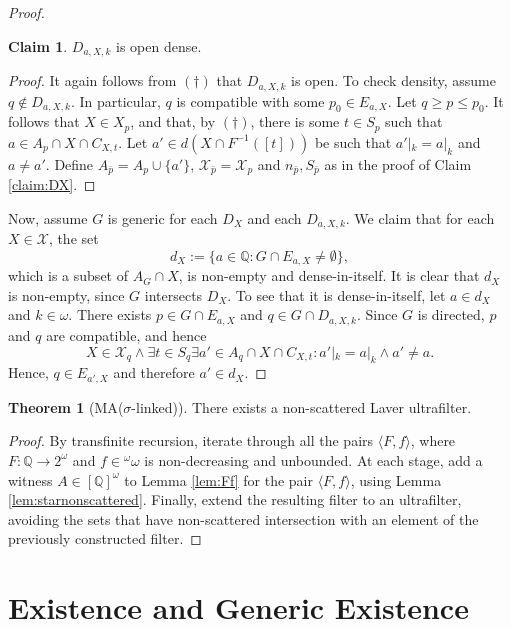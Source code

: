 \documentclass[12pt]{article}
\theoremstyle{definition}
\newtheorem{thm}[nummer]{\sc Theorem}
\newtheorem{claim}[nummer]{\sc Claim}
\begin{document}
\begin{proof}
\begin{claim}
$D_{a,X,k}$ is open dense.
\end{claim}

\begin{proof}
It again follows from $(\dagger)$ that $D_{a,X,k}$ is open. To check density, assume $q \notin D_{a,X,k}$. In particular, $q$ is compatible with some $p_0 \in E_{a,X}$. Let $q \geq p \leq p_0$. It follows that $X \in X_p$, and that, by $(\dagger)$, there is some $t \in S_{p}$ such that $a \in A_{p}\cap X \cap C_{X,t}$. Let $a' \in d(X \cap F^{-1}([t]))$ be such that $a'|_k=a|_k$ and $a \neq a'$. Define $A_{\bar p}=A_p \cup \{a'\}$, $\mathcal{X}_{\bar p}=\mathcal{X}_p$ and $n_{\bar p}, S_{\bar p}$ as in the proof of Claim \ref{claim:DX}.
\end{proof}

Now, assume $G$ is generic for each $D_X$ and each $D_{a,X,k}$. We claim that for each $X \in \mathcal{X}$, the set 
\[d_X:=\{a \in \mathbb{Q}: G \cap E_{a,X} \neq \emptyset\},\] which is a subset of $A_G \cap X$, is non-empty and dense-in-itself. It is clear that $d_X$ is non-empty, since $G$ intersects $D_X$. To see that it is dense-in-itself, let $a \in d_X$ and $k \in \omega$. There exists $p \in G \cap E_{a,X}$ and $q \in G \cap D_{a,X,k}$. Since $G$ is directed, $p$ and $q$ are compatible, and hence 
\[X \in \mathcal{X}_q \land \exists t \in S_q \exists a' \in A_q \cap X \cap C_{X,t}: a'|_k = a|_k \land a' \neq a.\]
Hence, $q \in E_{a', X}$ and therefore $a' \in d_X$.
\end{proof}

\begin{thm}[\textsf{MA}($\sigma$-linked)]
	There exists a non-scattered Laver ultrafilter.
\end{thm}

\begin{proof}
By transfinite recursion, iterate through all the pairs $\langle F,f\rangle$, where $F: \mathbb{Q} \to 2^\omega$ and $f \in {^{\omega}}\omega$ is non-decreasing and unbounded. At each stage, add a witness $A \in [\mathbb{Q}]^\omega$ to Lemma \ref{lem:Ff} for the pair $\langle F,f\rangle$, using Lemma \ref{lem:starnonscattered}. Finally, extend the resulting filter to an ultrafilter, avoiding the sets that have non-scattered intersection with an element of the previously constructed filter.
\end{proof}

\section{Existence and Generic Existence}\label{sec:existence}
\end{document}
